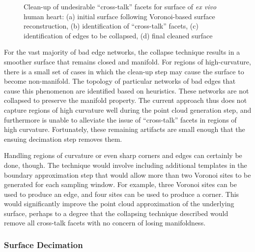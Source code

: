 \begin{figure}
{\label{fig:cross2-4}}		
%
\caption{Clean-up of undesirable ``cross-talk'' facets for surface of \textit{ex vivo} human heart: (a) initial surface following Voronoi-based surface reconstruction, (b) identification of ``cross-talk'' facets, (c) identification of edges to be collapsed, (d) final cleaned surface}
\label{fig:cross2}
\end{figure}

For the vast majority of bad edge networks, the collapse technique results in a smoother surface that remains closed and manifold. For regions of high-curvature, there is a small set of cases in which the clean-up step may cause the surface to become non-manifold. The topology of particular networks of bad edges that cause this phenomenon are identified based on heuristics. These networks are not collapsed to preserve the manifold property. The current approach thus does not capture regions of high curvature well during the point cloud generation step, and furthermore is unable to alleviate the issue of ``cross-talk'' facets in regions of high curvature. Fortunately, these remaining artifacts are small enough that the ensuing decimation step removes them.

Handling regions of curvature or even sharp corners and edges can certainly be done, though. The technique would involve including additional templates in the boundary approximation step that would allow more than two Voronoi sites to be generated for each sampling window. For example, three Voronoi sites can be used to produce an edge, and four sites can be used to produce a corner. This would significantly improve the point cloud approximation of the underlying surface, perhaps to a degree that the collapsing technique described would remove all cross-talk facets with no concern of losing manifoldness.

\subsubsection{Surface Decimation}

